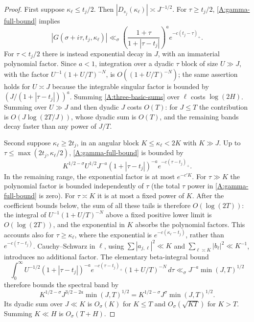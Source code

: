\begin{proof}
First suppose $\kappa_\ell\leq t_j/2$. Then
$|D_{s_j}(\kappa_\ell)|\asymp J^{-1/2}$.
For $\tau\geq t_j/2$, \eqref{A:gamma-full-bound} implies
\[
 |G(\sigma+i\tau,t_j,\kappa_\ell)|
 \ll_\sigma
 \left(\frac{1+\tau}{1+|\tau-t_j|}\right)^a
 e^{-c(t_j-\tau)_+}.
\]
For $\tau<t_j/2$ there is instead exponential decay in $J$,
with an immaterial polynomial factor. Since $a<1$, integration
over a dyadic $\tau$ block of size $U\gg J$, with the factor
$U^{-1}(1+U/T)^{-N}$, is
$O((1+U/T)^{-N})$; the same assertion holds for $U\asymp J$
because the integrable singular factor is bounded by
$(J/(1+|\tau-t_j|))^a$.
Summing \eqref{A:three-basic-sums} over $\ell$ costs $\log(2H)$.
Summing over $U\gg J$ and then dyadic $J$ costs $O(T)$:
for $J\leq T$ the contribution is
$O(J\log(2T/J))$, whose dyadic sum is $O(T)$, and the remaining
bands decay faster than any power of $J/T$.

Second suppose $\kappa_\ell\geq2t_j$, in an angular block
$K\leq\kappa_\ell<2K$ with $K\gg J$.
Up to $\tau\leq\max(2t_j,\kappa_\ell/2)$,
\eqref{A:gamma-full-bound} is bounded by
\[
 K^{1/2-\sigma}U^{1/2}J^{-a}(1+|\tau-t_j|)^{-a}
 e^{-c(\tau-t_j)_+}.
\]
In the remaining range, the exponential factor is at most
$e^{-c'K}$. For $\tau\gg K$ the polynomial factor is bounded
independently of $\tau$ (the total $\tau$ power in
\eqref{A:gamma-full-bound} is zero). For $\tau\asymp K$ it is
at most a fixed power of $K$. After the coefficient bounds below,
the sum of all these tails is therefore $O(\log(2T))$:
the integral of $U^{-1}(1+U/T)^{-N}$ above a fixed positive
lower limit is $O(\log(2T))$, and the exponential in $K$
absorbs the polynomial factors. This accounts also for
$\tau\geq\kappa_\ell$, where the exponential is
$e^{-c(\kappa_\ell-t_j)}$, rather than
$e^{-c(\tau-t_j)}$.
Cauchy--Schwarz in $\ell$, using
$\sum|a_{j,\ell}|^2\ll K$ and
$\sum_{\ell\asymp K}|b_\ell|^2\ll K^{-1}$, introduces no
additional factor. The elementary beta-integral bound
\[
 \int_0^\infty U^{-1/2}(1+|\tau-t_j|)^{-a}
 e^{-c(\tau-t_j)_+}(1+U/T)^{-N}\,d\tau
 \ll_\sigma J^{-a}\min(J,T)^{1/2}
\]
therefore bounds the spectral band by
\[
 K^{1/2-\sigma}J^{3/2-2a}\min(J,T)^{1/2}
 =K^{1/2-\sigma}J^\sigma\min(J,T)^{1/2}.
\]
Its dyadic sum over $J\ll K$ is $O_\sigma(K)$ for $K\leq T$
and $O_\sigma(\sqrt{KT})$ for $K>T$. Summing $K\ll H$ is
$O_\sigma(T+H)$.


\end{proof}
